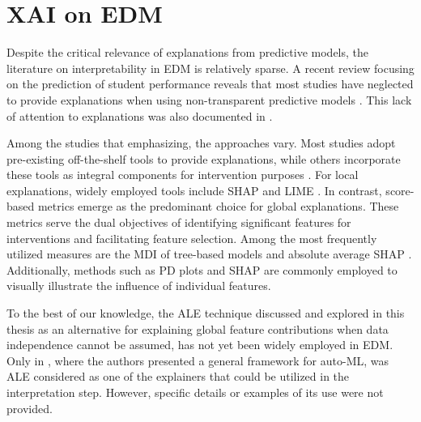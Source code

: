 \section{XAI on EDM}

Despite the critical relevance of explanations from predictive models, the literature on interpretability in \gls{EDM} is relatively sparse. A recent review focusing on the prediction of student performance reveals that most studies have neglected to provide explanations when using non-transparent predictive models \cite{Chitti2020NeedPrediction}. This lack of attention to explanations was also documented in \cite{Livieris2023AnMining}. 

Among the studies that emphasizing, the approaches vary. Most studies adopt pre-existing off-the-shelf tools to provide explanations, while others incorporate these tools as integral components for intervention purposes \cite{Mu2020TowardsStudents, Afzaal2021ExplainableSelf-Regulation}. For local explanations, widely employed tools include \gls{SHAP} \cite{Livieris2023AnMining, Chiu2020GenderHypothesis, Doewes2020StructuralScoring, Oliveira2023TowardsEnglish} and LIME \cite{Livieris2023AnMining, Matetic2019MiningNetworks, Zabriskie2019UsingOutcomes, Hasib2022APerformance, Chen2022Week-WiseIntelligence}. In contrast, score-based metrics emerge as the predominant choice for global explanations. These metrics serve the dual objectives of identifying significant features for interventions and facilitating feature selection. Among the most frequently utilized measures are the \gls{MDI} of tree-based models \cite{Cortez2008UsingPerformance, AshrafATechniques, Zhao2020PredictingData} and absolute average \gls{SHAP} \cite{Hoq2023AnalysisCourse, Rohani2023EarlyMOOC}. Additionally, methods such as \gls{PD} plots \cite{Hong2022RandomSchool, Masci2018StudentApproach} and \gls{SHAP} \cite{Chiu2020GenderHypothesis, Hoq2023AnalysisCourse} are commonly employed to visually illustrate the influence of individual features.

To the best of our knowledge, the \gls{ALE} technique discussed and explored in this thesis as an alternative for explaining global feature contributions when data independence cannot be assumed, has not yet been widely employed in \gls{EDM}. Only in \cite{NovilloRangone2022AutomationLearning}, where the authors presented a general framework for auto-\gls{ML}, was \gls{ALE} considered as one of the explainers that could be utilized in the interpretation step. However, specific details or examples of its use were not provided.

